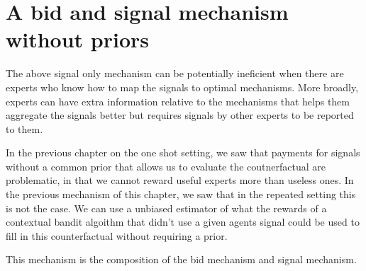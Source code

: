\section{A bid and signal mechanism without priors}



The above signal only mechanism can be potentially ineficient when there are experts who know how to map the signals to optimal mechanisms. More broadly, experts can have extra information relative to the mechanisms that helps them aggregate the signals better but requires signals by other experts to be reported to them. 

In the previous chapter on the one shot setting, we saw that payments for  signals without a common prior that allows us to evaluate the coutnerfactual are problematic, in that we cannot reward useful experts more than useless ones. In the previous mechanism of this chapter, we saw that in the repeated setting this is not the case. We can use a unbiased estimator of what the rewards of a contextual bandit algoithm that didn't use a given agents signal could be used to fill in this counterfactual without requiring a prior.

This mechanism is the composition of the bid mechanism and signal mechanism.


